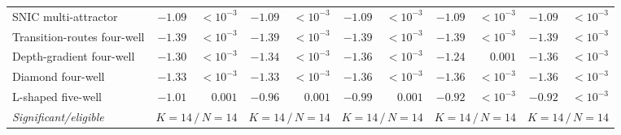 \begin{tabular}{@{}l rr rr rr rr rr@{}}
SNIC multi-attractor & $\mathbf{-1.09}$ & $<\!10^{-3}$ & $\mathbf{-1.09}$ & $<\!10^{-3}$ & $\mathbf{-1.09}$ & $<\!10^{-3}$ & $\mathbf{-1.09}$ & $<\!10^{-3}$ & $\mathbf{-1.09}$ & $<\!10^{-3}$ \\
Transition-routes four-well & $\mathbf{-1.39}$ & $<\!10^{-3}$ & $\mathbf{-1.39}$ & $<\!10^{-3}$ & $\mathbf{-1.39}$ & $<\!10^{-3}$ & $\mathbf{-1.39}$ & $<\!10^{-3}$ & $\mathbf{-1.39}$ & $<\!10^{-3}$ \\
Depth-gradient four-well & $\mathbf{-1.30}$ & $<\!10^{-3}$ & $\mathbf{-1.34}$ & $<\!10^{-3}$ & $\mathbf{-1.36}$ & $<\!10^{-3}$ & $\mathbf{-1.24}$ & $0.001$ & $\mathbf{-1.36}$ & $<\!10^{-3}$ \\
Diamond four-well & $\mathbf{-1.33}$ & $<\!10^{-3}$ & $\mathbf{-1.33}$ & $<\!10^{-3}$ & $\mathbf{-1.36}$ & $<\!10^{-3}$ & $\mathbf{-1.36}$ & $<\!10^{-3}$ & $\mathbf{-1.36}$ & $<\!10^{-3}$ \\
L-shaped five-well & $\mathbf{-1.01}$ & $0.001$ & $\mathbf{-0.96}$ & $0.001$ & $\mathbf{-0.99}$ & $0.001$ & $\mathbf{-0.92}$ & $<\!10^{-3}$ & $\mathbf{-0.92}$ & $<\!10^{-3}$ \\
\midrule
\emph{Significant/eligible} & \multicolumn{2}{c}{$K{=}14\,/\,N{=}14$} & \multicolumn{2}{c}{$K{=}14\,/\,N{=}14$} & \multicolumn{2}{c}{$K{=}14\,/\,N{=}14$} & \multicolumn{2}{c}{$K{=}14\,/\,N{=}14$} & \multicolumn{2}{c}{$K{=}14\,/\,N{=}14$} \\
\bottomrule
\end{tabular}